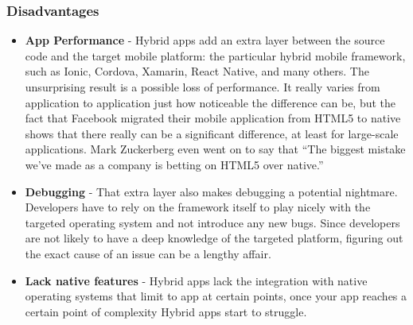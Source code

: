 \subsubsection{Disadvantages}
\begin{itemize}
    \item \textbf{App Performance} - Hybrid apps add an extra layer between the source code and the target mobile platform: the particular hybrid mobile framework, such as Ionic, Cordova, Xamarin, React Native, and many others. The unsurprising result is a possible loss of performance. It really varies from application to application just how noticeable the difference can be, but the fact that Facebook migrated their mobile application from HTML5 to native shows that there really can be a significant difference, at least for large-scale applications. Mark Zuckerberg even went on to say that “The biggest mistake we've made as a company is betting on HTML5 over native.”
    \item \textbf{Debugging} - That extra layer also makes debugging a potential nightmare. Developers have to rely on the framework itself to play nicely with the targeted operating system and not introduce any new bugs. Since developers are not likely to have a deep knowledge of the targeted platform, figuring out the exact cause of an issue can be a lengthy affair.
    \item \textbf{Lack native features} - Hybrid apps lack the integration with native operating systems that limit to app at certain points, once your app reaches a certain point of complexity Hybrid apps start to struggle.
\end{itemize}
%
%
%
%
%